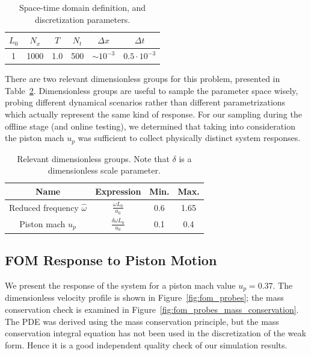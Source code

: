 \documentclass[../../thesis.tex]{subfiles}
\begin{document}
\begin{table}[h]
    \centering
    \caption{Space-time domain definition, and discretization parameters.}
    \begin{tabular}{cccccc}
        \toprule
        $L_0$ & $N_x$      & $T$ & $N_t$  & $\Delta x$     & $\Delta t$          \\ \midrule
        1     & 1000       & 1.0 & 500    & $\sim 10^{-3}$ & $0.5 \cdot 10^{-3}$  \\
        \bottomrule
    \end{tabular}
    \label{tab:discretization_parameters}
\end{table}
There are two relevant dimensionless groups for this problem, 
presented in Table~\ref{tab:dimensionless_groups}. 
Dimensionless groups are useful to sample the parameter space 
wisely, probing different dynamical scenarios rather
than different parametrizations which actually represent the same kind of response.
For our sampling during the offline stage (and online testing), 
we determined that taking into consideration the piston mach $u_p$ was sufficient
to collect physically distinct system responses.
\begin{table}[h]
    \centering
    \caption{Relevant dimensionless groups.
    Note that $\delta$ is a dimensionless scale parameter.}
    \begin{tabular}{cccc}
    \toprule
        Name                               & Expression                      & Min. & Max. \\ 
        \midrule
        Reduced frequency $\hat{\omega}$  & $\frac{\omega L_0}{a_0}$        & 0.6   & 1.65 \\[2mm]
        Piston mach $u_p$                 & $\frac{\delta \omega L_0}{a_0}$ & 0.1  & 0.4   \\
        \bottomrule
    \end{tabular}
    \label{tab:dimensionless_groups}
\end{table}

\subsection{FOM Response to Piston Motion}
\label{sec:fom_response}
We present the response of the system for a piston mach value $u_p = 0.37$.
The dimensionless velocity profile is shown 
in Figure~\ref{fig:fom_probes};
the mass conservation check is examined 
in Figure~\ref{fig:fom_probes_mass_conservation}.
The PDE was derived using the mass conservation principle,
but the mass conservation integral equation has not been 
used in the discretization of the weak form.
Hence it is a good independent quality check of our simulation results.
\end{document}
